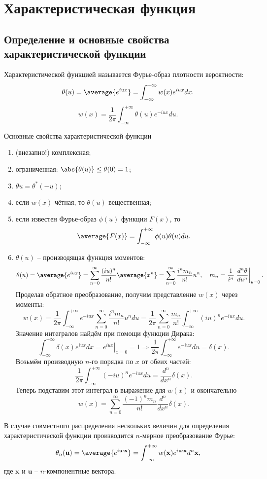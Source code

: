 \section{Характеристическая функция}
\subsection{Определение и основные свойства характеристической функции}

Характеристической функцией называется Фурье-образ плотности вероятности:
\[
    \theta(u) = \average{e^{iux}} = \int_{-\infty}^{+\infty} w(x) e^{iux} dx.
\]
\[
    w(x) = \frac{1}{2\pi}\int_{-\infty}^{+\infty} \theta(u) e^{-iux} du.
\]

Основные свойства характеристической функции
\begin{enumerate}
    \item (внезапно!) комплексная;
    \item ограниченная: \( \abs{\theta(u)} \le \theta(0) = 1 \);
    \item \( \theta{u} = \theta^*(-u) \);
    \item если \( w(x) \) чётная, то \( \theta(u) \) вещественная;
    \item если известен Фурье-образ \( \phi(u) \) функции \( F(x) \), то
        \[
            \average{F(x)} = \int_{-\infty}^{+\infty} \phi(u)\theta(u) du.
        \]
    \item \( \theta(u) \) -- производящая функция моментов:
        \[
            \theta(u) = \average{e^{iux}} =
            \sum_{n=0}^\infty \frac{(iu)^n}{n!}\average{x^n} =
            \sum_{n=0}^\infty \frac{i^n m_n}{n!}u^n,\quad
            m_n = \frac{1}{i^n}\left.\frac{d^n\theta}{du^n}\right|_{u=0}.
        \]
        Проделав обратное преобразование, получим представление \( w(x) \) через
        моменты:
        \[
            w(x) = \frac{1}{2\pi}\int_{-\infty}^{+\infty} e^{-iux}
            \sum_{n=0}^\infty \frac{i^n m_n}{n!}u^n du =
            \frac{1}{2\pi} \sum_{n=0}^\infty \frac{m_n}{n!}
            \int_{-\infty}^{+\infty}(iu)^n e^{-iux} du.
        \]
        Значение интегралов найдём при помощи функции Дирака:
        \[
            \int_{-\infty}^{+\infty} \delta(x) e^{iux} dx =
            \left.e^{iux}\right|_{x=0} = 1 \Rightarrow
            \frac{1}{2\pi}\int_{-\infty}^{+\infty} e^{-iux} du = \delta(x).
        \]
        Возьмём производную \( n \)-го порядка по \( x \) от обеих частей:
        \[
             \frac{1}{2\pi}\int_{-\infty}^{+\infty} (-iu)^n e^{-iux} du =
             \frac{d^n}{dx^n}\delta(x).
        \]
        Теперь подставим этот интеграл в выражение для \( w(x) \) и
        окончательно
        \[
            w(x) =  \sum_{n=0}^\infty \frac{(-1)^n m_n}{n!}
                \frac{d^n}{dx^n}\delta(x).
        \]
\end{enumerate}
В случае совместного распределения нескольких величин для определения
характеристической функции производится \( n \)-мерное преобразование Фурье:
\[
    \theta_n(\textbf{u}) = \average{e^{i\textbf{u}\cdot\textbf{x}}} =
    \int_{-\infty}^{+\infty} w(\textbf{x}) e^{i \textbf{u}\cdot\textbf{x}}
    d^n \textbf{x},
\]
где \( \textbf{x} \) и \( \textbf{u} \) -- \( n \)-компонентные вектора.


